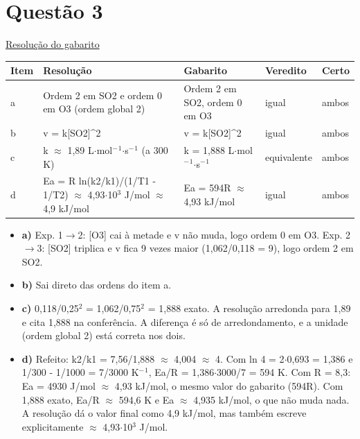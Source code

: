 \documentclass{article}%
\begin{document}
\section*{Questão 3}%
\href{https://poliedroresolve.sistemapoliedro.com.br/vestibulares/ime/2027/ime-2-fase-dia-3-28-10-2026-2-fase-dia-3/dissertativa-3-quimica-2-fase-dia-3-ime-2027}{Resolução do gabarito}\par\smallskip%
\begin{longtable}{@{}p{} p{} p{} p{} p{}@{}}\toprule Item & Resolução & Gabarito & Veredito & Certo \\ \midrule
a & Ordem 2 em SO2 e ordem 0 em O3 (ordem global 2) & Ordem 2 em SO2, ordem 0 em O3 & igual & ambos \\
b & v = k{[}SO2{]}\^{}2 & v = k{[}SO2{]}\^{}2 & igual & ambos \\
c & k $\approx$ 1,89 L$\cdot$mol$^{-}$$^{1}$$\cdot$s$^{-}$$^{1}$ (a 300 K) & k = 1,888 L$\cdot$mol$^{-}$$^{1}$$\cdot$s$^{-}$$^{1}$ & equivalente & ambos \\
d & Ea = R ln(k2/k1)/(1/T1 - 1/T2) $\approx$ 4,93$\cdot$10$^3$ J/mol $\approx$ 4,9 kJ/mol & Ea = 594R $\approx$ 4,93 kJ/mol & igual & ambos \\
\bottomrule\end{longtable}%
\begin{itemize}%
\item%
\textbf{a)} Exp. 1$\to$2: {[}O3{]} cai à metade e v não muda, logo ordem 0 em O3. Exp. 2$\to$3: {[}SO2{]} triplica e v fica 9 vezes maior (1,062/0,118 = 9), logo ordem 2 em SO2.%
\item%
\textbf{b)} Sai direto das ordens do item a.%
\item%
\textbf{c)} 0,118/0,25$^2$ = 1,062/0,75$^2$ = 1,888 exato. A resolução arredonda para 1,89 e cita 1,888 na conferência. A diferença é só de arredondamento, e a unidade (ordem global 2) está correta nos dois.%
\item%
\textbf{d)} Refeito: k2/k1 = 7,56/1,888 $\approx$ 4,004 $\approx$ 4. Com ln 4 = 2$\cdot$0,693 = 1,386 e 1/300 - 1/1000 = 7/3000 K$^{-}$$^{1}$, Ea/R = 1,386$\cdot$3000/7 = 594 K. Com R = 8,3: Ea = 4930 J/mol $\approx$ 4,93 kJ/mol, o mesmo valor do gabarito (594R). Com 1,888 exato, Ea/R $\approx$ 594,6 K e Ea $\approx$ 4,935 kJ/mol, o que não muda nada. A resolução dá o valor final como 4,9 kJ/mol, mas também escreve explicitamente $\approx$ 4,93$\cdot$10$^3$ J/mol.%
\end{itemize}%
\end{document}
